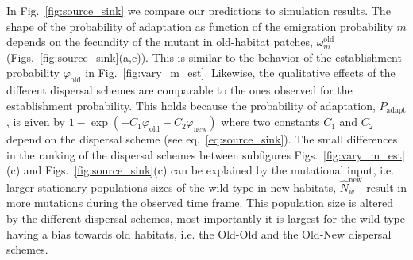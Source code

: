 \documentclass[11pt]{article}
\newcommand{\chg}[1]{\textcolor{change}{#1}}
\begin{document}
In Fig.~\ref{fig:source_sink} we compare our predictions to simulation results. The shape of the probability of adaptation as function of the emigration probability $m$ depends on the fecundity of the mutant in old-habitat patches, $\omega^\text{old}_m$ (Figs.~\ref{fig:source_sink}(a,c)). This is similar to the behavior of the establishment probability $\varphi_{\text{old}}$ in Fig.~\ref{fig:vary_m_est}. Likewise, the qualitative effects of the different dispersal schemes are comparable to the ones observed for the establishment probability. \chg{This holds because the probability of adaptation, $P_{\text{adapt}}$, is given by $1-\exp(-C_1 \varphi_{\text{old}} -C_2 \varphi_{\text{new}})$ where two constants $C_1$ and $C_2$ depend on the dispersal scheme (see eq.~\eqref{eq:source_sink}). \linelabel{R2-35}The small differences in the ranking of the dispersal schemes between subfigures Figs.~\ref{fig:vary_m_est}(c) and Figs.~\ref{fig:source_sink}(c) can be explained by the mutational input, i.e. larger stationary populations sizes of the wild type in new habitats, $\widehat{N}_w^{\text{new}}$ result in more mutations during the observed time frame. This population size is altered by the different dispersal schemes, most importantly it is largest for the wild type having a bias towards old habitats, i.e. the Old-Old and the Old-New dispersal schemes.} 
\end{document}
